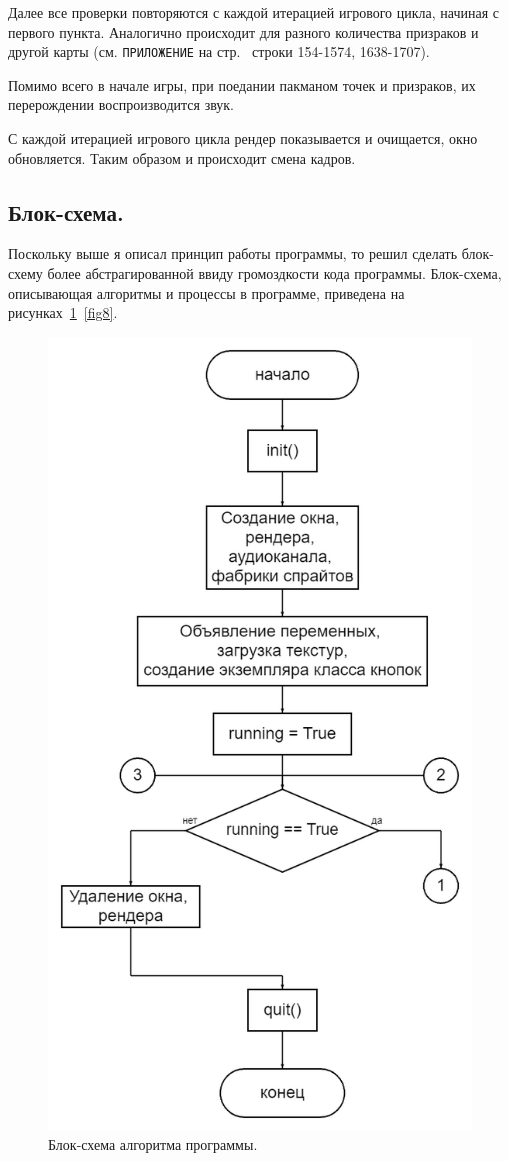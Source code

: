 Далее все проверки повторяются с каждой итерацией игрового цикла, начиная с первого пункта. Аналогично происходит для разного количества призраков и другой карты (см. \texttt{ПРИЛОЖЕНИЕ} на стр.~\pageref{code:main} строки 154-1574, 1638-1707).

Помимо всего в начале игры, при поедании пакманом точек и призраков, их перерождении воспроизводится звук.

С каждой итерацией игрового цикла рендер показывается и очищается, окно обновляется. Таким образом и происходит смена кадров.

\subsection{\label{subsec:ch02/sec01/sub08}Блок-схема.}
Поскольку выше я описал принцип работы программы, то решил сделать блок-схему более абстрагированной ввиду громоздкости кода программы. Блок-схема, описывающая алгоритмы и процессы в программе, приведена на рисунках~\ref{fig7}~\ref{fig8}.
\begin{figure}[H]
	\centering
	\includegraphics[width=0.8\linewidth]{images/flow1.png}
	\caption{Блок-схема алгоритма программы.}
	\label{fig7}
\end{figure}
